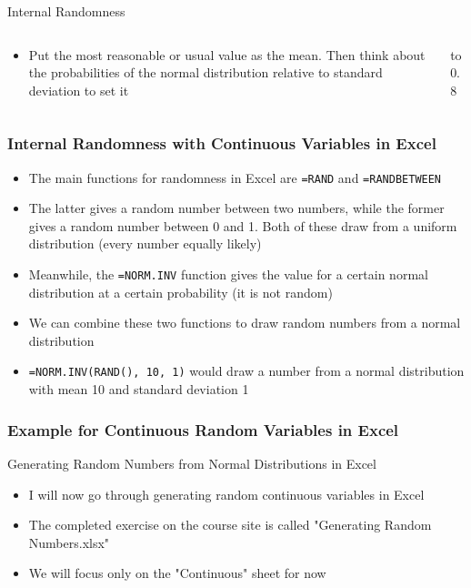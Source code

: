 \documentclass[handout, 11pt]{beamer}
\begin{document}
\begin{section}{Internal Randomness}
\begin{frame}
\begin{columns}
\begin{column}{0.5\textwidth}
{\begin{itemize}
\vfill
\item Put the most reasonable or usual value as the mean. Then think about the probabilities of the normal distribution relative to standard deviation to set it
\end{itemize}}
\end{column}
\begin{column}{0.5\textwidth}
\vbox to 0.8
\end{column}
\end{columns}
\end{frame}
\begin{frame}
\frametitle{Internal Randomness with Continuous Variables in Excel}
\begin{itemize}
\item The main functions for randomness in Excel are
\texttt{=RAND}
and
\texttt{=RANDBETWEEN}
\vfill
\item The latter gives a random number between two numbers, while the former gives a random number between 0 and 1. Both of these draw from a uniform distribution (every number equally likely)
\vfill
\item Meanwhile, the
\texttt{=NORM.INV}
function gives the value for a certain normal distribution at a certain probability (it is not random)
\vfill
\item We can combine these two functions to draw random numbers from a normal distribution
\vfill
\item \texttt{=NORM.INV(RAND(), 10, 1)}
would draw a number from a normal distribution with mean 10 and standard deviation 1
\end{itemize}
\end{frame}
\begin{frame}
\frametitle{Example for Continuous Random Variables in Excel}
{
\begin{block}{Generating Random Numbers from Normal Distributions in Excel}
\begin{itemize}
\item I will now go through generating random continuous variables in Excel
\item The completed exercise on the course site is called "Generating Random Numbers.xlsx"
\item We will focus only on the "Continuous" sheet for now
\end{itemize}

\end{block}}
\end{frame}
\end{section}
\end{document}

